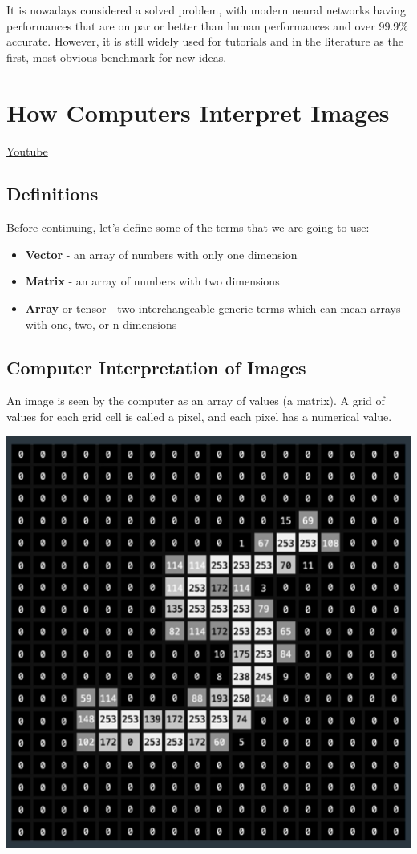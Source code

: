 It is nowadays considered a solved problem, with modern neural networks having performances that are on par or better than human performances and over 99.9\% accurate. However, it is still widely used for tutorials and in the literature as the first, most obvious benchmark for new ideas.

\section{How Computers Interpret Images}
\href{https://www.youtube.com/watch?v=mEPfoM68Fx4&t=2s&ab_channel=Udacity}{Youtube} \newline

\subsection{Definitions}

Before continuing, let's define some of the terms that we are going to use:

\begin{itemize}
    \item \textbf{Vector} - an array of numbers with only one dimension
    \item \textbf{Matrix} - an array of numbers with two dimensions
    \item \textbf{Array} or tensor - two interchangeable generic terms which can mean arrays with one, two, or n dimensions
\end{itemize}

\subsection{Computer Interpretation of Images}

An image is seen by the computer as an array of values (a matrix). A grid of values for each grid cell is called a pixel, and each pixel has a numerical value.

\includegraphics[width=0.5\linewidth]{img//cnn/image.png}

